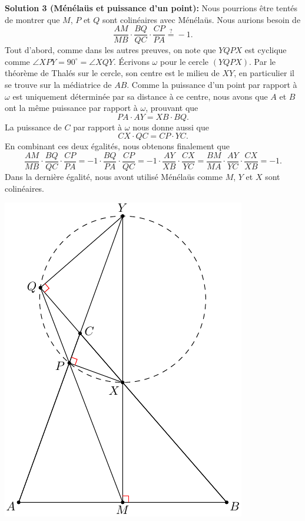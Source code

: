 {\textbf{Solution 3 (Ménélaüs et puissance d'un point):} Nous pourrions être tentés de montrer que $M$, $P$ et $Q$ sont colinéaires avec Ménélaüs. Nous aurions besoin de
\[
\frac{AM}{MB}\cdot \frac{BQ}{QC}\cdot \frac{CP}{PA}\stackrel{?}{=}-1.
\]
Tout d'abord, comme dans les autres preuves, on note que $YQPX$ est cyclique comme $\angle XPY=90^\circ=\angle XQY$. Écrivons $\omega$ pour le cercle $(YQPX)$. Par le théorème de Thalés sur le cercle, son centre est le milieu de $XY$, en particulier il se trouve sur la médiatrice de $AB$. Comme la puissance d'un point par rapport à $\omega$ est uniquement déterminée par sa distance à ce centre, nous avons que $A$ et $B$ ont la même puissance par rapport à $\omega$, prouvant que
\[
PA\cdot AY=XB\cdot BQ.
\]
La puissance de $C$ par rapport à $\omega$ nous donne aussi que
\[
CX\cdot QC=CP\cdot YC.
\]
En combinant ces deux égalités, nous obtenons finalement que
\[
\frac{AM}{MB}\cdot \frac{BQ}{QC}\cdot \frac{CP}{PA}=-1\cdot \frac{BQ}{PA}\cdot \frac{CP}{QC}=-1\cdot \frac{AY}{XB}\cdot \frac{CX}{YC} =\frac{BM}{MA}\cdot \frac{AY}{YC}\cdot \frac{CX}{XB}=-1.
\]
Dans la dernière égalité, nous avont utilisé Ménélaüs comme $M$, $Y$ et $X$ sont colinéaires.
\begin{center}
\includegraphics{g2fig}
\end{center}

}
